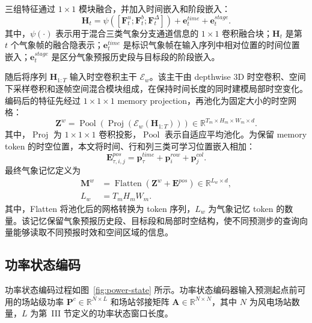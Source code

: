 三组特征通过 \(1\times1\) 模块融合，并加入时间嵌入和阶段嵌入：
\begin{equation}
\mathbf{H}_{t}=\psi([\mathbf{F}^{u}_{t};\mathbf{F}^{b}_{t};\mathbf{F}^{\Delta}_{t}])
+\mathbf{e}^{time}_{t}+\mathbf{e}^{stage}_{t}.
\end{equation}
其中，\(\psi(\cdot)\) 表示用于混合三类气象分支通道信息的 \(1\times1\) 卷积融合块；\(\mathbf{H}_{t}\) 是第 \(t\) 个气象帧的融合隐表示；\(\mathbf{e}^{time}_{t}\) 是标识气象帧在输入序列中相对位置的时间位置嵌入；\(\mathbf{e}^{stage}_{t}\) 是区分气象预报历史段与目标段的阶段嵌入。

随后将序列 \(\mathbf{H}_{1:T}\) 输入时空卷积主干 \(\mathcal{E}_{w}\)。该主干由 depthwise 3D 时空卷积、空间下采样卷积和逐帧空间混合模块组成，在保持时间长度的同时建模局部时空变化。编码后的特征先经过 \(1\times1\times1\) memory projection，再池化为固定大小的时空网格：
\begin{equation}
\mathbf{Z}^{w}=
\operatorname{Pool}\left(\operatorname{Proj}(\mathcal{E}_{w}(\mathbf{H}_{1:T}))\right)
\in\mathbb{R}^{T_m\times H_m\times W_m\times d}.
\end{equation}
其中，\(\operatorname{Proj}\) 为 \(1\times1\times1\) 卷积投影，\(\operatorname{Pool}\) 表示自适应平均池化。为保留 memory token 的时空位置，本文将时间、行和列三类可学习位置嵌入相加：
\begin{equation}
\mathbf{E}^{pos}_{\tau,i,j}=
\mathbf{p}^{time}_{\tau}+\mathbf{p}^{row}_{i}+\mathbf{p}^{col}_{j}.
\end{equation}
最终气象记忆定义为
\begin{equation}
\begin{aligned}
\mathbf{M}^{w}
&=\operatorname{Flatten}(\mathbf{Z}^{w}+\mathbf{E}^{pos})
\in\mathbb{R}^{L_w\times d},\\
L_w&=T_mH_mW_m.
\end{aligned}
\end{equation}
其中，Flatten 将池化后的网格转换为 token 序列，\(L_w\) 为气象记忆 token 的数量。该记忆保留气象预报历史段、目标段和局部时空结构，使不同预测步的查询向量能够读取不同预报时效和空间区域的信息。

\subsection{功率状态编码}

功率状态编码过程如图~\ref{fig:power-state} 所示。功率状态编码器输入预测起点前可用的场站级功率 \(\mathbf{P}^{c}\in\mathbb{R}^{N\times L}\) 和场站邻接矩阵 \(\mathbf{A}\in\mathbb{R}^{N\times N}\)，其中 \(N\) 为风电场站数量，\(L\) 为第~III 节定义的功率状态窗口长度。

